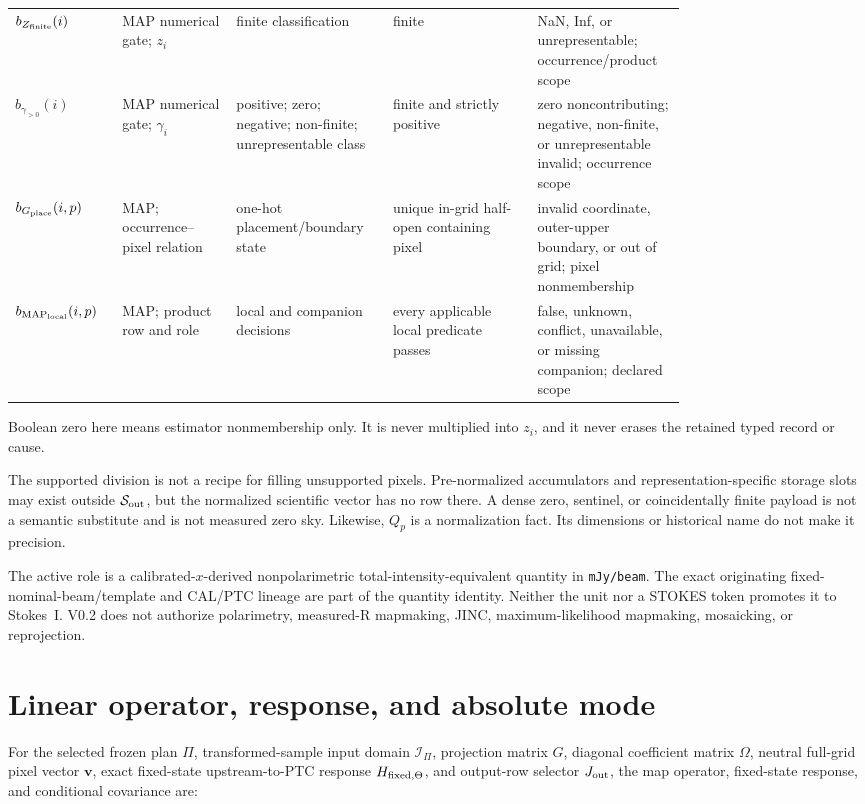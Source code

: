 \documentclass[10pt]{article}
\newcommand{\code}[1]{\nolinkurl{#1}}
\begin{document}
{\begin{longtable}{L{0.11\linewidth}L{0.15\linewidth}L{0.17\linewidth}L{0.19\linewidth}L{0.16\linewidth}}
\(b_{Z_{\rm finite}}(i)\) & MAP numerical gate; \(z_i\) & finite classification & finite & NaN, Inf, or unrepresentable; occurrence/product scope\\
\(b_{\gamma_{>0}}(i)\) & MAP numerical gate; \(\gamma_i\) & positive; zero; negative; non-finite; unrepresentable class & finite and strictly positive & zero noncontributing; negative, non-finite, or unrepresentable invalid; occurrence scope\\
\(b_{G_{\rm place}}(i,p)\) & MAP; occurrence--pixel relation & one-hot placement/boundary state & unique in-grid half-open containing pixel & invalid coordinate, outer-upper boundary, or out of grid; pixel nonmembership\\
\(b_{{\rm MAP}_{\rm local}}(i,p)\) & MAP; product row and role & local and companion decisions & every applicable local predicate passes & false, unknown, conflict, unavailable, or missing companion; declared scope\\
\bottomrule
\end{longtable}
}

Boolean zero here means estimator nonmembership only. It is never multiplied
into \(z_i\), and it never erases the retained typed record or cause.

The supported division is not a recipe for filling unsupported pixels.
Pre-normalized accumulators and representation-specific storage slots may exist outside
\(\mathcal S_{\rm out}\), but the normalized scientific vector has no row
there. A dense zero, sentinel, or coincidentally finite payload is not a
semantic substitute and is not measured zero sky. Likewise, \(Q_p\) is a
normalization fact. Its dimensions or historical name do not make it
precision.

The active role is a calibrated-\(x\)-derived nonpolarimetric
total-intensity-equivalent quantity in \code{mJy/beam}. The exact originating
fixed-nominal-beam/template and CAL/PTC lineage are part of the quantity
identity. Neither the unit nor a STOKES token promotes it to Stokes~I. V0.2
does not authorize polarimetry, measured-R mapmaking, JINC,
maximum-likelihood mapmaking, mosaicking, or reprojection.

\clearpage
\section{Linear operator, response, and absolute mode}\label{sec:response}

For the selected frozen plan \(\Pi\), transformed-sample input domain
\(\mathcal I_\Pi\), projection matrix \(G\), diagonal coefficient matrix
\(\Omega\), neutral full-grid pixel vector \(\boldsymbol v\), exact fixed-state
upstream-to-PTC response \(H_{{\rm fixed},\Theta}\), and output-row selector
\(J_{\rm out}\), the map operator, fixed-state response, and conditional
covariance are:
\end{document}
